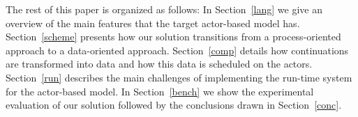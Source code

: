 The rest of this paper is organized as follows: In Section~\ref{lang} we give an overview of the main features that the target actor-based model has. Section~\ref{scheme} presents how our solution transitions from a process-oriented approach to a data-oriented approach. Section~\ref{comp} details how continuations are transformed into data and how this data is scheduled on the actors. Section~\ref{run} describes the main challenges of implementing the run-time system for the actor-based model. In Section~\ref{bench} we show the experimental evaluation of our solution followed by the conclusions drawn in Section~\ref{conc}.






